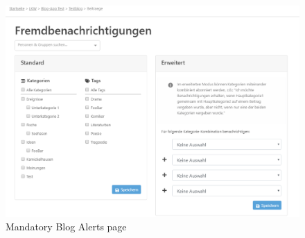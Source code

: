 \documentclass[Bachelor,BIF,english]{twbook}
\begin{document}
\begin{figure}[!htbp]
\centering
\includegraphics[width=1\linewidth]{PICs/mandatory_alerts.eps}
\caption{Mandatory Blog Alerts page}\label{FigMandatoryAlerts}
\end{figure}
\clearpage
\end{document}
